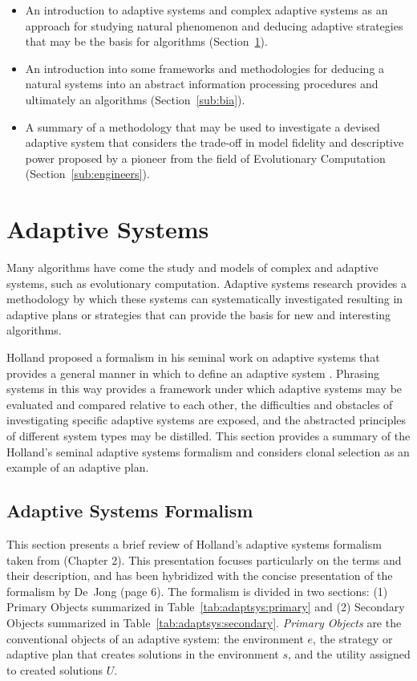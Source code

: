 \documentclass[a4paper, 11pt]{article}
\begin{document}
\begin{itemize}
	\item An introduction to adaptive systems and complex adaptive systems as an approach for studying natural phenomenon and deducing adaptive strategies that may be the basis for algorithms (Section~\ref{sub:adaptive}).
	\item An introduction into some frameworks and methodologies for deducing a natural systems into an abstract information processing procedures and ultimately an algorithms (Section~\ref{sub:bia}).
	\item A summary of a methodology that may be used to investigate a devised adaptive system that considers the trade-off in model fidelity and descriptive power proposed by a pioneer from the field of Evolutionary Computation (Section~\ref{sub:engineers}).
\end{itemize}


% 
% 
\section{Adaptive Systems}
\label{sub:adaptive}
Many algorithms have come the study and models of complex and adaptive systems, such as evolutionary computation. Adaptive systems research provides a methodology by which these systems can systematically investigated resulting in adaptive plans or strategies that can provide the basis for new and interesting algorithms. 

Holland proposed a formalism in his seminal work on adaptive systems that provides a general manner in which to define an adaptive system \cite{Holland1975}. Phrasing systems in this way provides a framework under which adaptive systems may be evaluated and compared relative to each other, the difficulties and obstacles of investigating specific adaptive systems are exposed, and the abstracted principles of different system types may be distilled. This section provides a summary of the Holland's seminal adaptive systems formalism and considers clonal selection as an example of an adaptive plan.

\subsection{Adaptive Systems Formalism}
This section presents a brief review of Holland's adaptive systems formalism taken from \cite{Holland1975} (Chapter 2). This presentation focuses particularly on the terms and their description, and has been hybridized with the concise presentation of the formalism by De~Jong \cite{Jong1975} (page 6). The formalism is divided in two sections: (1) Primary Objects summarized in Table~\ref{tab:adaptsys:primary} and (2) Secondary Objects summarized in Table~\ref{tab:adaptsys:secondary}. \emph{Primary Objects} are the conventional objects of an adaptive system: the environment $e$, the strategy or adaptive plan that creates solutions in the environment $s$, and the utility assigned to created solutions $U$.
\end{document}
